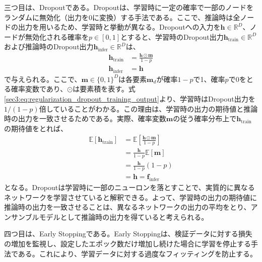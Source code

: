 \documentclass[12pt]{jarticle}
\numberwithin{equation}{section}    %
\numberwithin{figure}{section}      %
\numberwithin{table}{section}      %
\begin{document}
三つ目は、Dropout\cite{srivastava2014dropout}である。Dropoutは、学習時に一定の確率で一部のノードをランダムに無効化（出力を0に変換）する手法である。ここで、推論時は全ノードの出力を用いるため、学習時と挙動が異なる。Dropoutへの入力を$\bm{h} \in \mathbb{R}^{D}$、ノードが無効化される確率を$p \in [0, 1]$とすると、学習時のDropout出力$\bm{h}_{\text{train}} \in \mathbb{R}^{D}$および推論時のDropout出力$\bm{h}_{\text{infer}} \in \mathbb{R}^{D}$は、
\begin{align}
    \bm{h}_{\text{train}} & = \frac{\bm{h} \odot \bm{m}}{1 - p} \label{sec3:eq:regularization_dropout_training_output} \\
    \bm{h}_{\text{infer}} & = \bm{h}
\end{align}
で与えられる。ここで、$\bm{m} \in \{0, 1\}^{D}$は各要素$\bm{m}_{d}$が確率$1 - p$で1、確率$p$で0をとる確率変数であり、$\odot$は要素積を表す。式\eqref{sec3:eq:regularization_dropout_training_output}より、学習時はDropout出力を$1 / (1 - p)$倍していることがわかる。この理由は、学習時の出力の期待値と推論時の出力を一致させるためである。実際、確率変数$\bm{m}$の従う確率分布上で$\bm{h}_{\text{train}}$の期待値をとれば、
\begin{align}
    \mathbb{E}[\bm{h}_{\text{train}}] & = \mathbb{E} \left[ \frac{\bm{h} \odot \bm{m}}{1 - p} \right] \\
                                      & = \frac{\bm{h}}{1 - p} \mathbb{E}[\bm{m}]                     \\
                                      & = \frac{\bm{h}}{1 - p} (1 - p)                                \\
                                      & = \bm{h} = \bm{f}_{\text{infer}}
\end{align}
となる。Dropoutは学習時に一部のニューロンを落とすことで、実質的に異なるネットワークを学習させていると解釈できる。よって、学習時の出力の期待値に推論時の出力を一致させることは、異なるネットワークの出力の平均をとり、アンサンブルモデルとして推論時の出力を得ていると考えられる。

四つ目は、Early Stoppingである。Early Stoppingは、検証データに対する損失の増加を監視し、設定したエポック数だけ増加し続けた場合に学習を停止する手法である。これにより、学習データに対する過度なフィッティングを防止する。
\end{document}
